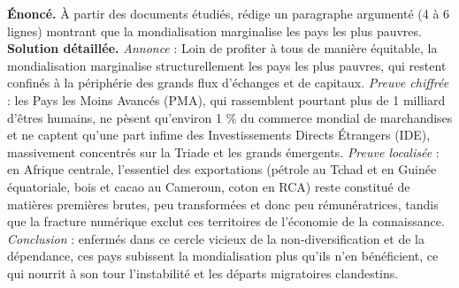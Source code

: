 \documentclass[11pt]{article}
\begin{document}
\begin{exoresolu}
\textbf{Énoncé.} À partir des documents étudiés, rédige un paragraphe argumenté (4 à 6 lignes) montrant que la mondialisation marginalise les pays les plus pauvres.
\tcblower
\textbf{Solution détaillée.} \emph{Annonce} : Loin de profiter à tous de manière équitable, la mondialisation marginalise structurellement les pays les plus pauvres, qui restent confinés à la périphérie des grands flux d'échanges et de capitaux. \emph{Preuve chiffrée} : les Pays les Moins Avancés (PMA), qui rassemblent pourtant plus de 1 milliard d'êtres humains, ne pèsent qu'environ 1 \% du commerce mondial de marchandises et ne captent qu'une part infime des Investissements Directs Étrangers (IDE), massivement concentrés sur la Triade et les grands émergents. \emph{Preuve localisée} : en Afrique centrale, l'essentiel des exportations (pétrole au Tchad et en Guinée équatoriale, bois et cacao au Cameroun, coton en RCA) reste constitué de matières premières brutes, peu transformées et donc peu rémunératrices, tandis que la fracture numérique exclut ces territoires de l'économie de la connaissance. \emph{Conclusion} : enfermés dans ce cercle vicieux de la non-diversification et de la dépendance, ces pays subissent la mondialisation plus qu'ils n'en bénéficient, ce qui nourrit à son tour l'instabilité et les départs migratoires clandestins.
\end{exoresolu}
\end{document}
